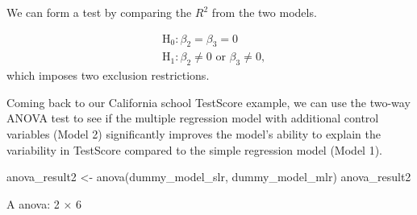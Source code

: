 \documentclass[
  12pt,
  letterpaper,
]{scrbook}
\newenvironment{Shaded}{\begin{snugshade}}{\end{snugshade}}
\newcommand{\FunctionTok}[1]{\textcolor[rgb]{0.28,0.35,0.67}{#1}}
\newcommand{\NormalTok}[1]{\textcolor[rgb]{0.00,0.23,0.31}{#1}}
\newcommand{\OtherTok}[1]{\textcolor[rgb]{0.00,0.23,0.31}{#1}}
\theoremstyle{definition}
\theoremstyle{plain}
\theoremstyle{remark}
\begin{document}
We can form a test by comparing the \(R^2\) from the two models.

\[
\begin{aligned}
&\text{H}_0: \beta_2 = \beta_3 = 0 \\
&\text{H}_1: \beta_2 \ne 0 \text{ or } \beta_3\ne 0 ,
\end{aligned}
\] which imposes two exclusion restrictions.

Coming back to our California school TestScore example, we can use the
two-way ANOVA test to see if the multiple regression model with
additional control variables (Model 2) significantly improves the
model's ability to explain the variability in TestScore compared to the
simple regression model (Model 1).

\begin{Shaded}
\begin{Highlighting}[]
\NormalTok{anova\_result2 }\OtherTok{\textless{}{-}} \FunctionTok{anova}\NormalTok{(dummy\_model\_slr, dummy\_model\_mlr)}
\NormalTok{anova\_result2}
\end{Highlighting}
\end{Shaded}

A anova: 2 × 6
\end{document}
